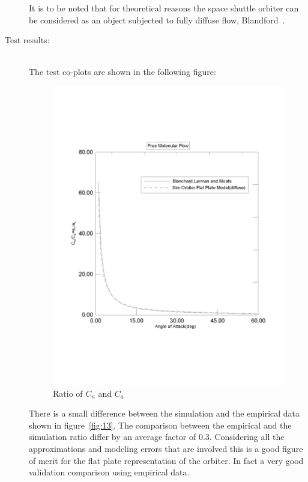 \begin{description}
It is to be noted that for theoretical reasons the space shuttle orbiter
can be considered as an object subjected to fully diffuse flow,
Blandford~\cite{Blan}.
\item[Test results:] \ \\
The test co-plots are shown in the following figure:
\begin{figure}[hbpt]
\includegraphics [width=7in]{figs/ratio.pdf}
\caption{Ratio of $C_n$ and $C_a$}
\label{fig:12}
\end{figure}
\clearpage
There is a small difference between the simulation and
the empirical data shown in figure~\ref{fig:13}.  The comparison between
the empirical and the simulation ratio differ by an average factor of 0.3.
Considering all the approximations and modeling errors that are involved
this is a good figure of merit for the flat plate representation of the
orbiter.  In fact a very good validation comparison using empirical data.
\begin{figure}[H]

\end{figure}
\end{description}
